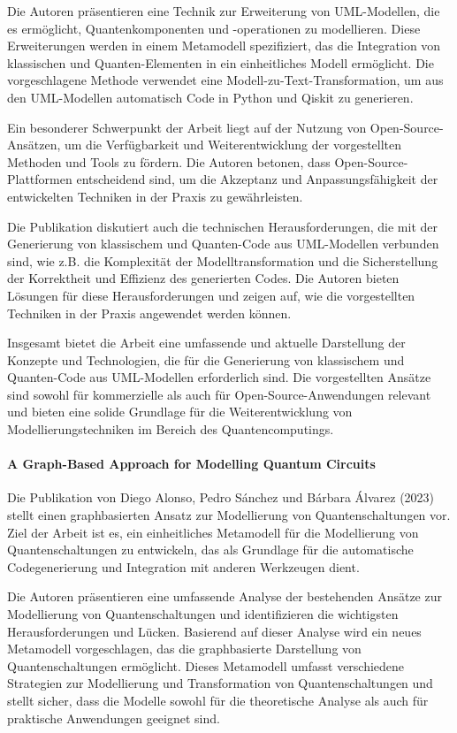 Die Autoren präsentieren eine Technik zur Erweiterung von UML-Modellen, die es ermöglicht, Quantenkomponenten 
und -operationen zu modellieren. Diese Erweiterungen werden in einem Metamodell spezifiziert, das die Integration 
von klassischen und Quanten-Elementen in ein einheitliches Modell ermöglicht. Die vorgeschlagene Methode verwendet 
eine Modell-zu-Text-Transformation, um aus den UML-Modellen automatisch Code in Python und Qiskit zu generieren.

Ein besonderer Schwerpunkt der Arbeit liegt auf der Nutzung von Open-Source-Ansätzen, um die Verfügbarkeit und 
Weiterentwicklung der vorgestellten Methoden und Tools zu fördern. Die Autoren betonen, dass Open-Source-Plattformen 
entscheidend sind, um die Akzeptanz und Anpassungsfähigkeit der entwickelten Techniken in der Praxis zu gewährleisten.

Die Publikation diskutiert auch die technischen Herausforderungen, die mit der Generierung von klassischem und 
Quanten-Code aus UML-Modellen verbunden sind, wie z.B. die Komplexität der Modelltransformation und die Sicherstellung 
der Korrektheit und Effizienz des generierten Codes. Die Autoren bieten Lösungen für diese Herausforderungen und 
zeigen auf, wie die vorgestellten Techniken in der Praxis angewendet werden können.

Insgesamt bietet die Arbeit eine umfassende und aktuelle Darstellung der Konzepte und Technologien, die für die 
Generierung von klassischem und Quanten-Code aus UML-Modellen erforderlich sind. Die vorgestellten Ansätze sind 
sowohl für kommerzielle als auch für Open-Source-Anwendungen relevant und bieten eine solide Grundlage für die 
Weiterentwicklung von Modellierungstechniken im Bereich des Quantencomputings.

\paragraph{A Graph-Based Approach for Modelling Quantum Circuits}

Die Publikation von Diego Alonso, Pedro Sánchez und Bárbara Álvarez (2023)~\cite{alonso2023graph} stellt einen graphbasierten Ansatz zur 
Modellierung von Quantenschaltungen vor. Ziel der Arbeit ist es, ein einheitliches Metamodell für die Modellierung 
von Quantenschaltungen zu entwickeln, das als Grundlage für die automatische Codegenerierung und Integration mit 
anderen Werkzeugen dient.

Die Autoren präsentieren eine umfassende Analyse der bestehenden Ansätze zur Modellierung von Quantenschaltungen 
und identifizieren die wichtigsten Herausforderungen und Lücken. Basierend auf dieser Analyse wird ein neues Metamodell 
vorgeschlagen, das die graphbasierte Darstellung von Quantenschaltungen ermöglicht. Dieses Metamodell umfasst 
verschiedene Strategien zur Modellierung und Transformation von Quantenschaltungen und stellt sicher, dass die 
Modelle sowohl für die theoretische Analyse als auch für praktische Anwendungen geeignet sind.

